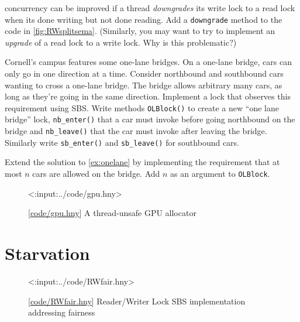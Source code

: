 \documentclass{report}
\newcommand{\harmonylink}[1]{%
[\href{https://harmony.cs.cornell.edu/#1}{\underline{#1}}]%
}
\newenvironment{code}{
\tcolorbox
}{
\endtcolorbox
}
\begin{document}
{\begin{problems}
concurrency can be improved if a thread \emph{downgrades} its write lock
to a read lock when its done writing but not done reading.  Add
a \texttt{downgrade} method to the code in \autoref{fig:RWsplitsema}.
(Similarly, you may want to try to implement an \emph{upgrade} of a
read lock to a write lock.  Why is this problematic?)
\item \label{ex:onelane} Cornell's campus features some one-lane bridges.
On a one-lane bridge,
cars can only go in one direction at a time. Consider northbound
and southbound cars wanting to cross a one-lane bridge.
The bridge allows arbitrary many cars, as long as they're going in the
same direction.
Implement a lock that observes this requirement using SBS.
Write methods \texttt{OLBlock()} to create a new ``one lane bridge'' lock,
\texttt{nb\_enter()} that a car must invoke before going northbound on
the bridge and \texttt{nb\_leave()} that the car must invoke after leaving
the bridge.  Similarly write \texttt{sb\_enter()} and \texttt{sb\_leave()}
for southbound cars.
\item Extend the solution to \autoref{ex:onelane} by implementing the
requirement that at most $n$ cars are allowed on the bridge.  Add $n$
as an argument to \texttt{OLBlock}.

\end{problems}

\begin{figure}
\begin{code}
<{:input:../code/gpu.hny}>
\end{code}
\caption{\harmonylink{code/gpu.hny} A thread-unsafe GPU allocator}
\label{fig:gpu}
\end{figure}

\chapter{Starvation}
\label{ch:starvation}
%

%

\begin{figure}
\begin{code}
{\small
<{:input:../code/RWfair.hny}>
}
\end{code}
\caption{\harmonylink{code/RWfair.hny} Reader/Writer Lock SBS implementation addressing fairness}
\label{fig:RWfair}
\end{figure}

}
\end{document}
